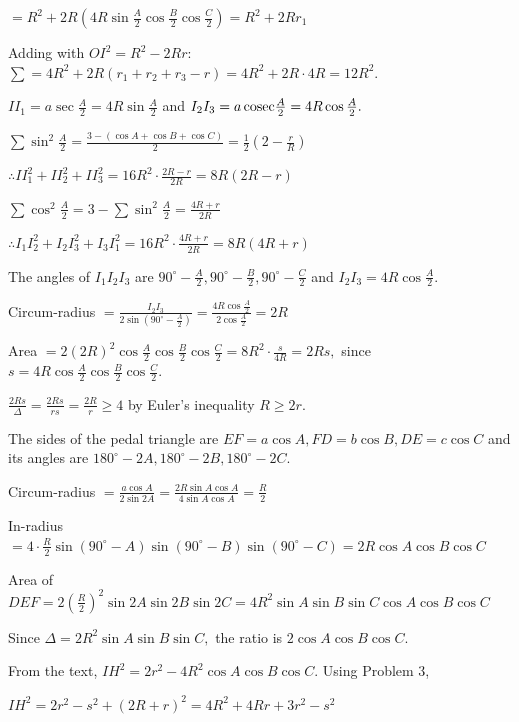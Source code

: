   $= R^2 + 2R\left(4R\sin\frac{A}{2}\cos\frac{B}{2}\cos\frac{C}{2}\right) = R^2 + 2Rr_1$

  Adding with $OI^2 = R^2 - 2Rr$: $\sum = 4R^2 + 2R(r_1 + r_2 + r_3 - r) = 4R^2 + 2R\cdot 4R = 12R^2.$
\item $II_1 = a\sec\frac{A}{2} = 4R\sin\frac{A}{2}$ and $I_2I_3 = a\,{\rm cosec}\frac{A}{2} = 4R\cos\frac{A}{2}.$

  $\sum\sin^2\frac{A}{2} = \frac{3 - (\cos A + \cos B + \cos C)}{2} = \frac{1}{2}\left(2 - \frac{r}{R}\right)$

  $\therefore II_1^2 + II_2^2 + II_3^2 = 16R^2\cdot\frac{2R - r}{2R} = 8R(2R - r)$

  $\sum\cos^2\frac{A}{2} = 3 - \sum\sin^2\frac{A}{2} = \frac{4R + r}{2R}$

  $\therefore I_1I_2^2 + I_2I_3^2 + I_3I_1^2 = 16R^2\cdot\frac{4R + r}{2R} = 8R(4R + r)$
\item The angles of $I_1I_2I_3$ are $90^\circ - \frac{A}{2}, 90^\circ - \frac{B}{2}, 90^\circ - \frac{C}{2}$ and $I_2I_3 =
  4R\cos\frac{A}{2}.$

  Circum-radius $= \frac{I_2I_3}{2\sin\left(90^\circ - \frac{A}{2}\right)} = \frac{4R\cos\frac{A}{2}}{2\cos\frac{A}{2}} = 2R$

  Area $= 2(2R)^2\cos\frac{A}{2}\cos\frac{B}{2}\cos\frac{C}{2} = 8R^2\cdot\frac{s}{4R} = 2Rs,$ since $s =
  4R\cos\frac{A}{2}\cos\frac{B}{2}\cos\frac{C}{2}.$

  $\frac{2Rs}{\Delta} = \frac{2Rs}{rs} = \frac{2R}{r}\geq 4$ by Euler's inequality $R\geq 2r.$
\item The sides of the pedal triangle are $EF = a\cos A, FD = b\cos B, DE = c\cos C$ and its angles are $180^\circ - 2A,
  180^\circ - 2B, 180^\circ - 2C.$

  Circum-radius $= \frac{a\cos A}{2\sin 2A} = \frac{2R\sin A\cos A}{4\sin A\cos A} = \frac{R}{2}$

  In-radius $= 4\cdot\frac{R}{2}\sin(90^\circ - A)\sin(90^\circ - B)\sin(90^\circ - C) = 2R\cos A\cos B\cos C$

  Area of $DEF = 2\left(\frac{R}{2}\right)^2\sin 2A\sin 2B\sin 2C = 4R^2\sin A\sin B\sin C\cos A\cos B\cos C$

  Since $\Delta = 2R^2\sin A\sin B\sin C,$ the ratio is $2\cos A\cos B\cos C.$
\item From the text, $IH^2 = 2r^2 - 4R^2\cos A\cos B\cos C.$ Using Problem 3,

  $IH^2 = 2r^2 - s^2 + (2R + r)^2 = 4R^2 + 4Rr + 3r^2 - s^2$

